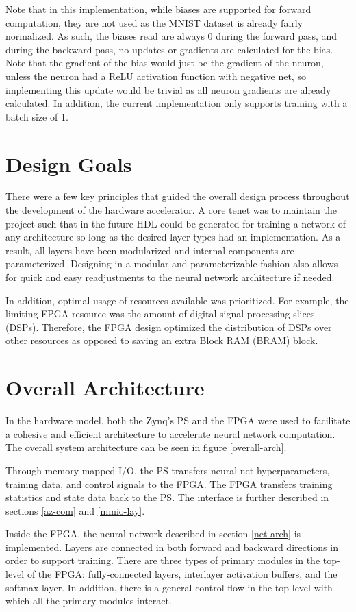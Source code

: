 Note that in this implementation, while biases are supported for forward computation, they are not used as the MNIST dataset is already fairly normalized. As such, the biases read are always 0 during the forward pass, and during the backward pass, no updates or gradients are calculated for the bias. Note that the gradient of the bias would just be the gradient of the neuron, unless the neuron had a ReLU activation function with negative net, so implementing this update would be trivial as all neuron gradients are already calculated. In addition, the current implementation only supports training with a batch size of 1.


\section{Design Goals}
There were a few key principles that guided the overall design process throughout the development of the hardware accelerator. A core tenet was to maintain the project such that in the future HDL could be generated for training a network of any architecture so long as the desired layer types had an implementation. As a result, all layers have been modularized and internal components are parameterized. Designing in a modular and parameterizable fashion also allows for quick and easy readjustments to the neural network architecture if needed.
\par 
In addition, optimal usage of resources available was prioritized. For example, the limiting FPGA resource was the amount of digital signal processing slices (DSPs). Therefore, the FPGA design optimized the distribution of DSPs over other resources as opposed to saving an extra Block RAM (BRAM) block. 

\section{Overall Architecture}
In the hardware model, both the Zynq's PS and the FPGA were used to facilitate a cohesive and efficient architecture to accelerate neural network computation. The overall system architecture can be seen in figure \ref{overall-arch}. 

Through memory-mapped I/O, the PS transfers neural net hyperparameters, training data, and control signals to the FPGA. The FPGA transfers training statistics and state data back to the PS. The interface is further described in sections \ref{az-com} and \ref{mmio-lay}.

Inside the FPGA, the neural network described in section \ref{net-arch} is implemented. Layers are connected in both forward and backward directions in order to support training. There are three types of primary modules in the top-level of the FPGA: fully-connected layers, interlayer activation buffers, and the softmax layer. In addition, there is a general control flow in the top-level with which all the primary modules interact.

